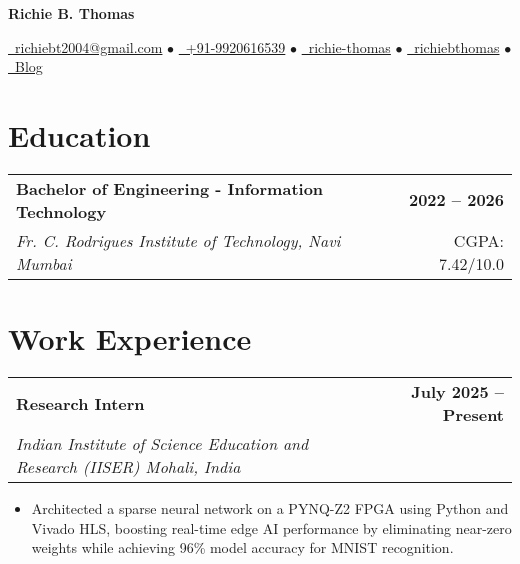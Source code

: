 \documentclass[11pt,a4paper]{article}
\makeatletter
\newcommand{\resumeItem}[1]{\item\small{#1}}
\newcommand{\resumeSubheading}[4]{
  \vspace{-1pt}
  \begin{tabular*}{\textwidth}[t]{l@{\extracolsep{\fill}}r}
    \textbf{#1} & \textcolor{light}{\small\textbf{#2}} \\
    \textit{\small#3} & \textcolor{light}{\small#4} \\
  \end{tabular*}\vspace{-5pt}
}
\makeatother
\begin{document}
\begin{center}
    {\LARGE\bfseries\color{primary} Richie B. Thomas}
    
    \vspace{0.3em}
    
    \href{mailto:richiebt2004@gmail.com}{\faEnvelope\ richiebt2004@gmail.com} $\bullet$
    \href{tel:+919920616539}{\faMobile\ +91-9920616539} $\bullet$
    \href{https://www.linkedin.com/in/richie-thomas/}{\faLinkedin\ richie-thomas} $\bullet$
    \href{https://github.com/richiebthomas}{\faGithub\ richiebthomas} $\bullet$
    \href{https://richiebthomas.github.io/blog}{\faGlobe\ Blog}
\end{center}

\vspace{0.2em}

\section{Education}

\resumeSubheading
{Bachelor of Engineering - Information Technology}{2022 -- 2026}
{Fr. C. Rodrigues Institute of Technology, Navi Mumbai}{CGPA: 7.42/10.0}

\vspace{0.1em}

\section{Work Experience}

\resumeSubheading
{Research Intern}{July 2025 -- Present}
{Indian Institute of Science Education and Research (IISER) Mohali, India}{}
\begin{itemize}
    \resumeItem{Architected a sparse neural network on a PYNQ-Z2 FPGA using Python and Vivado HLS, boosting real-time edge AI performance by eliminating near-zero weights while achieving 96\% model accuracy for MNIST recognition.}
\end{itemize}
\end{document}
